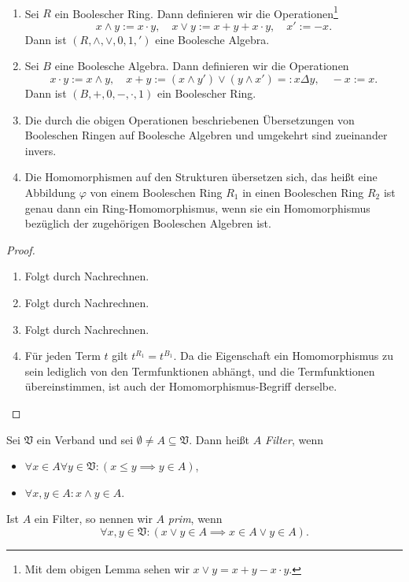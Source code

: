 \begin{proposition}{\ }
    \begin{enumerate}
        \item Sei $R$ ein Boolescher Ring. Dann definieren wir die Operationen\footnote{Mit dem obigen Lemma sehen wir $x \lor y = x + y - x \cdot y$.}
        $$ x \land y := x \cdot y, \quad x \lor y := x + y + x \cdot y, \quad x' := -x. $$
        Dann ist $(R, \land, \lor, 0, 1, ')$ eine Boolesche Algebra.

        \item Sei $B$ eine Boolesche Algebra. Dann definieren wir die Operationen
        $$ x \cdot y := x \land y, \quad x + y := (x \land y') \lor (y \land x') =: x \Delta y, \quad -x := x. $$
        Dann ist $(B, +, 0, -, \cdot, 1)$ ein Boolescher Ring.

        \item Die durch die obigen Operationen beschriebenen Übersetzungen von Booleschen Ringen auf Boolesche Algebren und umgekehrt sind zueinander invers.

        \item Die Homomorphismen auf den Strukturen übersetzen sich, das heißt eine Abbildung $\varphi$ von einem Booleschen Ring $R_1$ in einen Booleschen Ring $R_2$ ist genau dann ein Ring-Homomorphismus, wenn sie ein Homomorphismus bezüglich der zugehörigen Booleschen Algebren ist.
    \end{enumerate}
\end{proposition}

\begin{proof}{\ }
    \begin{enumerate}
        \item Folgt durch Nachrechnen.
        \item Folgt durch Nachrechnen.
        \item Folgt durch Nachrechnen.
        \item Für jeden Term $t$ gilt $t^{R_1}=t^{B_1}$. Da die Eigenschaft ein Homomorphismus zu sein lediglich von den Termfunktionen abhängt, und die Termfunktionen übereinstimmen, ist auch der Homomorphismus-Begriff derselbe.
    \end{enumerate}
\end{proof}

\begin{definition}
    Sei $\mathfrak{V}$ ein Verband und sei $\emptyset \neq A \subseteq \mathfrak{V}$. Dann heißt $A$ \emph{Filter}, wenn
    \begin{itemize}
        \item $\forall x \in A \forall y \in \mathfrak{V} : ( x \leq y \implies y \in A )$,
        \item $\forall x, y \in A : x \land y \in A$.
    \end{itemize}
    Ist $A$ ein Filter, so nennen wir $A$ \emph{prim}, wenn
    $$ \forall x ,y \in \mathfrak{V} : ( x \lor y \in A \implies x \in A \lor y \in A ). $$
    
\end{definition}

